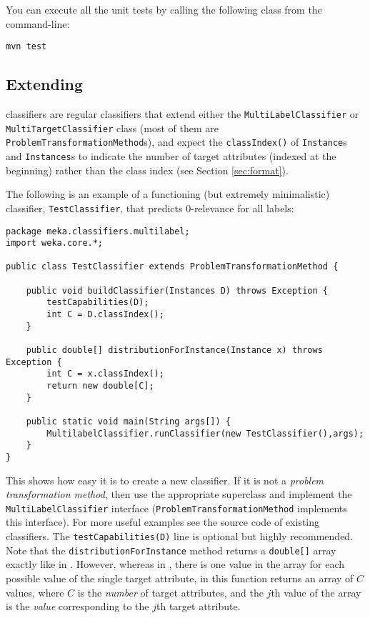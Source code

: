 \documentclass[11pt]{article}
\newcommand{\MEKA}{Meka}
\newcommand{\WEKA}{Weka}
\begin{document}
\noindent You can execute all the unit tests by calling the following class from the command-line:
\begin{lstlisting}
mvn test
\end{lstlisting}

\subsection{\label{sec:extending}Extending \framework{\MEKA}}%

\framework{\MEKA} classifiers are regular \framework{\WEKA} classifiers that extend
either the \texttt{MultiLabelClassifier} or \texttt{MultiTargetClassifier} class
(most of them are \texttt{ProblemTransformationMethod}s), and expect the
\texttt{classIndex()} of \texttt{Instance}s and \texttt{Instances}s to indicate
the number of target attributes (indexed at the beginning) rather than the class
index (see Section \ref{sec:format}).

The following is an example of a functioning (but extremely minimalistic) classifier, \texttt{TestClassifier}, that predicts $0$-relevance for all labels:

{\small
\lstset{basicstyle=\small\ttfamily,breaklines=true,language=java,frame=L,xleftmargin=\parindent}
\begin{lstlisting}
package meka.classifiers.multilabel;
import weka.core.*;

public class TestClassifier extends ProblemTransformationMethod {
	
    public void buildClassifier(Instances D) throws Exception {
        testCapabilities(D);
        int C = D.classIndex();
    }
    
    public double[] distributionForInstance(Instance x) throws Exception {
        int C = x.classIndex();
       	return new double[C];
    }
    
    public static void main(String args[]) {
        MultilabelClassifier.runClassifier(new TestClassifier(),args);
    }
}
\end{lstlisting}
}

This shows how easy it is to create a new classifier. If it is not a \textit{problem transformation method},
then use the appropriate \framework{\WEKA} superclass and implement the \texttt{MultiLabelClassifier}
interface (\texttt{ProblemTransformationMethod} implements this interface).
For more useful examples see the source code of existing \framework{\MEKA} classifiers.
The \texttt{testCapabilities(D)} line is optional but highly recommended. Note that the \texttt{distributionForInstance}
method returns a \texttt{double[]} array exactly like in \framework{\WEKA}. However, whereas in \framework{\WEKA},
there is one value in the array for each possible value of the single target attribute, in \framework{\MEKA} this
function returns an array of $C$ values, where $C$ is the \emph{number} of target attributes, and the $j$th value of
the array is the \emph{value} corresponding to the $j$th target attribute.
\end{document}
